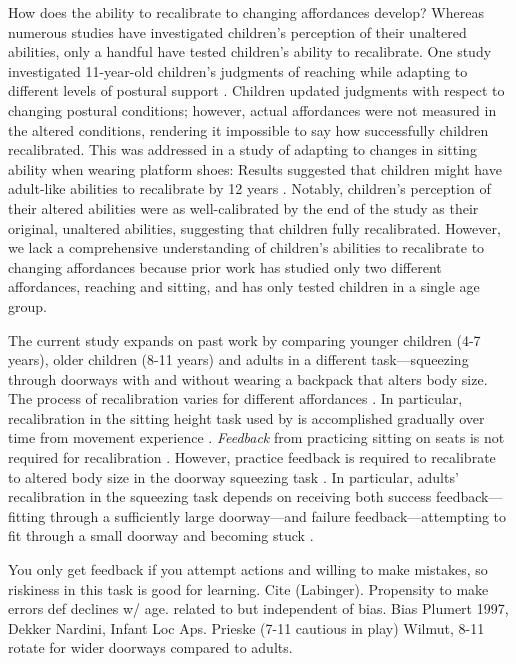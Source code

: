 \documentclass[a4paper,man,natbib,floatsintext,noextraspace]{apa6}
\begin{document}
How does the ability to recalibrate to changing affordances develop? Whereas numerous studies have investigated children's perception of their unaltered abilities, only a handful have tested children's ability to recalibrate. One study investigated 11-year-old children’s judgments of reaching while adapting to different levels of postural support \citep{JohnsonWade2009}. Children updated judgments with respect to changing postural conditions; however, actual affordances were not measured in the altered conditions, rendering it impossible to say how successfully children recalibrated. This was addressed in a study of adapting to changes in sitting ability when wearing platform shoes: Results suggested that children might have adult-like abilities to recalibrate by 12 years \citep{ChenRecal}. Notably, children's perception of their altered abilities were as well-calibrated by the end of the study as their original, unaltered abilities, suggesting that children fully recalibrated. However, we lack a comprehensive understanding of children's abilities to recalibrate to changing affordances because prior work has studied only two different affordances, reaching and sitting, and has only tested children in a single age group. 

The current study expands on past work by comparing younger children (4-7 years), older children (8-11 years) and adults in a different task---squeezing through doorways with and without wearing a backpack that alters body size. The process of recalibration varies for different affordances \citep{Recal}. In particular, recalibration in the sitting height task used by \cite{ChenRecal} is accomplished gradually over time from movement experience \cite{Mark87}. \textit{Feedback} from practicing sitting on seats is not required for recalibration \citep{MarkSitting90}. However, practice feedback is required to recalibrate to altered body size in the doorway squeezing task \citep{Recal,PregAps}. In particular, adults' recalibration in the squeezing task depends on receiving both success feedback---fitting through a sufficiently large doorway---and failure feedback---attempting to fit through a small doorway and becoming stuck \citep{DoorwayLearning}. 

You only get feedback if you attempt actions and willing to make mistakes, so riskiness in this task is good for learning. Cite (Labinger). Propensity to make errors def declines w/ age. related to but independent of bias. Bias Plumert 1997, Dekker Nardini, Infant Loc Aps. Prieske (7-11 cautious in play) Wilmut, 8-11 rotate for wider doorways compared to adults. 
\end{document}
